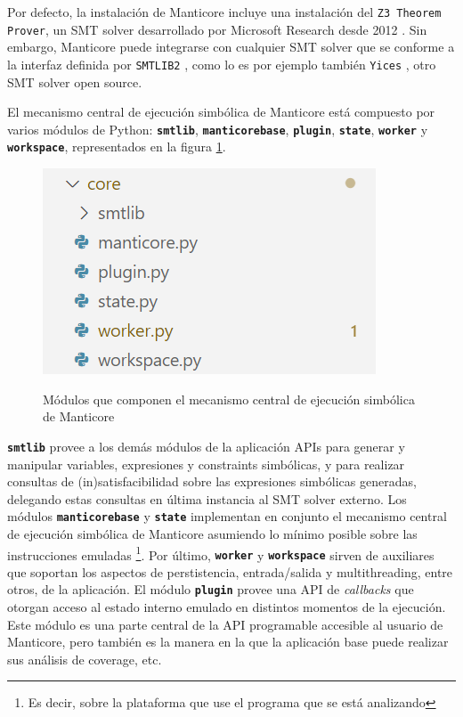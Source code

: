 Por defecto, la instalación de Manticore incluye una instalación del \texttt{Z3 Theorem Prover}, un SMT solver desarrollado por Microsoft Research desde 2012 \cite{z3TheoremProver}.
Sin embargo, Manticore puede integrarse con cualquier SMT solver que se conforme a la interfaz definida por \texttt{SMTLIB2} \cite{smtlib2}, como lo es por ejemplo también \texttt{Yices} \cite{yices}, otro SMT solver open source.

El mecanismo central de ejecución simbólica de Manticore está compuesto por varios módulos de Python: \texttt{\textbf{smtlib}}, \texttt{\textbf{manticorebase}}, \texttt{\textbf{plugin}}, \texttt{\textbf{state}}, \texttt{\textbf{worker}} y \texttt{\textbf{workspace}}, representados en la figura \ref{fig:core-modules}.

\begin{figure}
    \centering
    {\includegraphics {figs/core-architecture-manticore.png}}
    \caption{Módulos que componen el mecanismo central de ejecución simbólica de Manticore}
    \label{fig:core-modules}
\end{figure}

\texttt{\textbf{smtlib}} provee a los demás módulos de la aplicación APIs para generar y manipular variables, expresiones y constraints simbólicas, y para realizar consultas de (in)satisfacibilidad sobre las expresiones simbólicas generadas, delegando estas consultas en última instancia al SMT solver externo.
Los módulos \texttt{\textbf{manticorebase}} y \texttt{\textbf{state}} implementan en conjunto el mecanismo central de ejecución simbólica de Manticore asumiendo lo mínimo posible sobre las instrucciones emuladas \footnote{Es decir, sobre la plataforma que use el programa que se está analizando}.
Por último, \texttt{\textbf{worker}} y \texttt{\textbf{workspace}} sirven de auxiliares que soportan los aspectos de perstistencia, entrada/salida y multithreading, entre otros, de la aplicación.
El módulo \texttt{\textbf{plugin}} provee una API de \textit{callbacks} que otorgan acceso al estado interno emulado en distintos momentos de la ejecución.
Este módulo es una parte central de la API programable accesible al usuario de Manticore, pero también es la manera en la que la aplicación base puede realizar sus análisis de coverage, etc.

